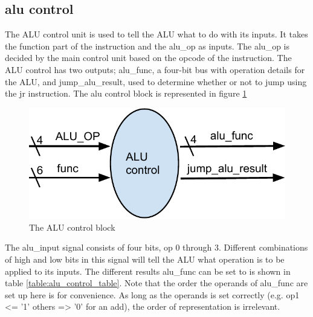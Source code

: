 \subsection*{alu control}

The ALU control unit is used to tell the ALU what to do with its inputs. It takes the function part of the instruction and the alu\_op as inputs. The alu\_op is decided by the main control unit based on the opcode of the instruction. The ALU control has two outputs; alu\_func, a four-bit bus with operation details for the ALU, and jump\_alu\_result, used to determine whether or not to jump using the jr instruction. The alu control block is represented in figure \ref {fig:alu_control}
\begin{figure}
	\label{fig:alu_control}
	\includegraphics{figures/alu_control.pdf}
	\caption{The ALU control block}
\end{figure}

The alu\_input signal consists of four bits, op 0 through 3. Different combinations of high and low bits in this signal will tell the ALU what operation is to be applied to its inputs.  The different results alu\_func can be set to is shown in table \ref{table:alu_control_table}. Note that the order the operands of alu\_func are set up here is for convenience. As long as the operands is set correctly (e.g. op1 <= '1' others => '0' for an add), the order of representation is irrelevant. 

